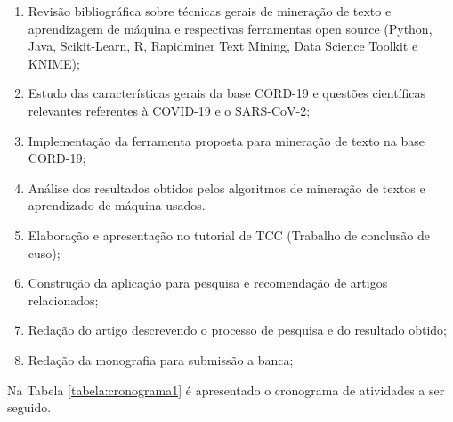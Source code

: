 \documentclass[
	12pt,				%
	a4paper,			%
	english,			%
	brazil,				%
	]{article}
\begin{document}
    \begin{enumerate}

        \item Revis\~ ao bibliogr\' afica sobre t\' ecnicas gerais de minera\c c\~ ao de texto e aprendizagem de m\' aquina e respectivas ferramentas open source (Python, Java, Scikit-Learn, R, Rapidminer Text Mining, Data Science Toolkit e KNIME);\label{a1}
        
        \item Estudo das caracter\' isticas gerais da base CORD-19 e quest\~ oes cient\' ificas relevantes referentes à COVID-19 e o SARS-CoV-2; \label{a2}

        \item Implementa\c c\~ ao da ferramenta proposta para minera\c c\~ ao de texto na base CORD-19;   \label{a3}

        \item An\' alise dos resultados obtidos pelos algoritmos de minera\c c\~ ao de textos e aprendizado de m\' aquina usados.   \label{a4}

        \item Elaboração e apresentação no tutorial de TCC (Trabalho de conclusão de cuso);  \label{a5}

        \item Constru{\c c}\~ ao da aplica{\c c}\~ ao para pesquisa e recomenda{\c c}\~ ao de artigos relacionados;   \label{a6}

         \item Reda{\c c}\~ ao do artigo descrevendo o processo de pesquisa e do resultado obtido;   \label{a7}

         \item Reda\c c\~ ao da monografia para submiss\~ ao a banca;   \label{a8}
    
\end{enumerate}

    Na Tabela \ref{tabela:cronograma1} \' e apresentado o cronograma de atividades a ser seguido.
 
\end{document}
